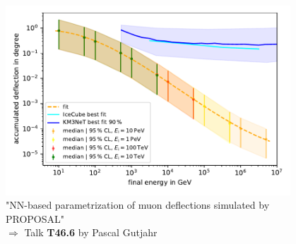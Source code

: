 \begin{frame}[c]
\begin{columns}[onlytextwidth]
\begin{column}{0.45\textwidth}
    \end{column}
        \begin{column}{0.55\textwidth}
    		\begin{figure}
    		  \includegraphics[width=\linewidth, height=.65\textheight, keepaspectratio]{plots/pascal.pdf}
    		  \captionsetup{justification=centering}
    		  \caption*{"NN-based parametrization of muon deflections simulated by PROPOSAL" \\ $\Rightarrow$ Talk \textbf{T46.6} by Pascal Gutjahr}
    		\end{figure}

        \end{column}
    \end{columns}
\end{frame}
